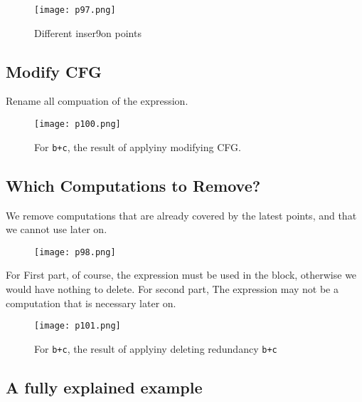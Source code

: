 \begin{figure}[H]
    \centering
     \texttt{[image: p97.png]}
         \caption{	Different	inser9on	points}
         \label{fig:p97}
\end{figure}
\subsection{Modify CFG}

Rename all compuation of the expression.  

\begin{figure}[H]
    \centering
     \texttt{[image: p100.png]}
         \caption{For \texttt{b+c}, the result of applyiny modifying CFG.}
         \label{fig:p100}
\end{figure}


\subsection{Which	Computations	to	Remove?	}
We	remove	computations	that	are	already	covered	by	
the	latest	points,	and	that	we	cannot	use	later	on.	

\begin{figure}[H]
    \centering
     \texttt{[image: p98.png]}
         
         \label{fig:p98}
\end{figure}




For {\color{red} First} part, of	course,	the	expression	
must	be	used	in	the	block,	
otherwise	we	would	have	
nothing	to	delete. For {\color{blue} second} part, The	expression	may	not	be	a	
computation	that	is	necessary	
later	on.	


\begin{figure}[H]
    \centering
     \texttt{[image: p101.png]}
         \caption{For \texttt{b+c}, the result of applyiny deleting redundancy \texttt{b+c}}
         \label{fig:p100}
\end{figure}



\subsection{A fully explained example}

